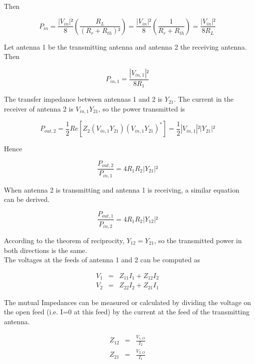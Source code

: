 \documentclass[a4paper,11pt]{report}
\begin{document}
Then

\begin{equation}
 P_{in}= \frac{|V_{in}|²}{8}\left(\frac{R_L}{(R_r+R_{th})²}\right)= \frac{|V_{in}|²}{8} \left(\frac{1}{R_r+R_{th}}\right)= \frac{|V_{in}|²}{8R_L}
\end{equation}

Let antenna 1 be the transmitting antenna and antenna 2 the receiving antenna. Then

\begin{equation}
 P_{in,1}= \frac{|V_{in,1}|²}{8R_1}
\end{equation}

The transfer impedance between antennas 1 and 2 is $Y_{21}$. The current in the receiver of antenna 2 is $V_{in,1}Y_{21}$, so the power transmitted is

\begin{equation}
 P_{out,2}= \frac{1}{2}Re[Z_2(V_{in,1}Y_{21})(V_{in,1}Y_{21})^*]=\frac{1}{2}|V_{in,1}|²|Y_{21}|²
\end{equation}

Hence

\begin{equation}
 \frac{ P_{out,2}}{P_{in,1}}= 4R_1R_2|Y_{21}|²
\end{equation}

When antenna 2 is transmitting and antenna 1 is receiving, a similar equation can be derived.

\begin{equation}
 \frac{ P_{out,1}}{P_{in,2}}= 4R_1R_2|Y_{12}|²
\end{equation}

According to the theorem of reciprocity, $Y_{12}=Y_{21}$, so the transmitted power in both directions is the same.\\

The voltages at the feeds of antenna 1 and 2 can be computed as

\begin{eqnarray}
 V_1&=&Z_{11}I_1+Z_{12}I_2\\
 V_2&=&Z_{22}I_2+Z_{21}I_1
\end{eqnarray}

The mutual Impedances can be measured or calculated by dividing the voltage on the open feed (i.e. I=0 at this feed) by the current at the feed of the transmitting antenna.

\begin{eqnarray}
 Z_{12}&=&\frac{V_{1,O}}{I_2}\\
Z_{21}&=&\frac{V_{2,O}}{I_1}
\end{eqnarray}
\end{document}
